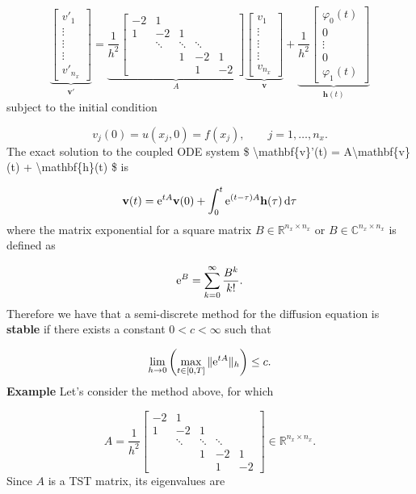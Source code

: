 \documentclass[12pt,a4paper]{article}
\begin{document}
\[
\underbrace{\begin{bmatrix}
v'_{1} \\
\vdots \\
\vdots \\
\vdots \\
v'_{n_x}
\end{bmatrix}}_{\mathbf{v}'} = 
\underbrace{\frac{1}{h^2}\begin{bmatrix}
- 2 & 1 & & & \\
1  & -2 & 1  & & \\
      & \ddots & \ddots & \ddots & \\
      &        & 1    & -2 & 1 \\
      &        &        & 1 & -2
\end{bmatrix}}_{A}
\underbrace{\begin{bmatrix}
v_{1} \\
\vdots \\
\vdots \\
\vdots \\
v_{n_x}
\end{bmatrix}}_{\mathbf{v}}
+ 
\underbrace{\frac{1}{h^2}\begin{bmatrix}
\varphi_0(t) \\
0 \\
\vdots \\
0 \\
 \varphi_1(t)
\end{bmatrix}}_{\mathbf{h}(t)}
\]
subject to the initial condition

\[
v_j(0) = u(x_j,0) = f(x_j), \qquad j = 1, \ldots, n_x.
\]
The exact solution to the coupled ODE system \$ {\textbackslash}mathbf\{v\}'(t) = A{\textbackslash}mathbf\{v\}(t) + {\textbackslash}mathbf\{h\}(t)  \$ is

\[
\mathbf{v}(t) = {\rm e}^{tA}\mathbf{v}(0) + \int_0^t {\rm e}^{(t - \tau)A}\mathbf{h}(\tau)\,{\rm d}\tau
\]
where the matrix exponential for a square matrix $B \in \mathbb{R}^{n_x \times n_x}$ or $B \in \mathbb{C}^{n_x \times n_x}$ is defined as

\[
    {\rm e}^{B} = \sum_{k=0}^{\infty}\frac{B^k}{k!}.
\]
Therefore we have that a semi-discrete method for the diffusion equation is \textbf{stable} if there exists a constant $0 <c < \infty$ such that

\[
\lim_{h \to 0}\left(\max_{t \in [0, T]}\| {\rm e}^{tA}\|_h \right) \leq c.
\]
\textbf{Example} Let's consider the method above, for which 

\[
A = \frac{1}{h^2}\begin{bmatrix}
- 2 & 1 & & & \\
1  & -2 & 1  & & \\
      & \ddots & \ddots & \ddots & \\
      &        & 1    & -2 & 1 \\
      &        &        & 1 & -2
\end{bmatrix} \in \mathbb{R}^{n_x \times n_x}.
\]
Since $A$ is a TST matrix, its eigenvalues are
\end{document}
